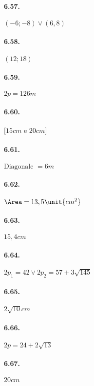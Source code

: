 \begin{multicols}{2}
\paragraph{6.57.} $(-6;-8)\vee (6,8)$

\paragraph{6.58.} $(12;18)$

\paragraph{6.59.} $2p=126\unit{m}$

\paragraph{6.60.} $[15\unit{cm}$ e $20\unit{cm}]$

\paragraph{6.61.} $\text{Diagonale }=6\unit{m}$

\paragraph{6.62.} $\Area=13,5\unit{{cm}^2}$

\paragraph{6.63.} $15,4\unit{cm}$

\paragraph{6.64.} $2p_1=42\vee 2p_2=57+3\sqrt{145}$

\paragraph{6.65.} $2\sqrt{10}\unit{cm}$

\paragraph{6.66.} $2p=24+2\sqrt{13}$

\paragraph{6.67.} $20\unit{cm}$


\end{multicols}
